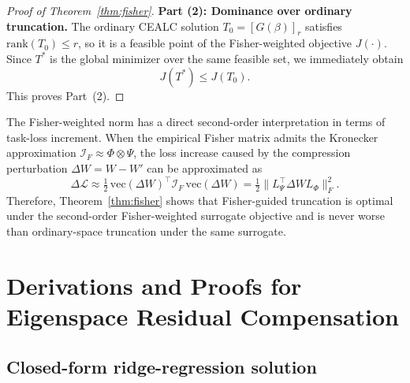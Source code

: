 \documentclass[a4paper,fleqn]{cas-dc}
\begin{document}
\begin{proof}[Proof of Theorem~\ref{thm:fisher}]
\medskip
\noindent\textbf{Part (2): Dominance over ordinary truncation.}
The ordinary CEALC solution $T_0=[G(\beta)]_r$ satisfies $\mathrm{rank}(T_0)\le r$, so it is a feasible point of the Fisher-weighted objective $J(\cdot)$. Since $T^*$ is the global minimizer over the same feasible set, we immediately obtain
\begin{equation}
J(T^*) \le J(T_0).
\end{equation}
This proves Part~(2).
\end{proof}

\begin{rmk}
The Fisher-weighted norm has a direct second-order interpretation in terms of task-loss increment. When the empirical Fisher matrix admits the Kronecker approximation $\mathcal{I}_F \approx \Phi \otimes \Psi$, the loss increase caused by the compression perturbation $\Delta W = W-W'$ can be approximated as
\begin{equation}
\Delta \mathcal{L} \approx \tfrac{1}{2}\,\mathrm{vec}(\Delta W)^{\top} \mathcal{I}_F \, \mathrm{vec}(\Delta W)
= \tfrac{1}{2}\|L_\Psi^{\top}\Delta W L_\Phi\|_F^2.
\end{equation}
Therefore, Theorem~\ref{thm:fisher} shows that Fisher-guided truncation is optimal under the second-order Fisher-weighted surrogate objective and is never worse than ordinary-space truncation under the same surrogate.
\end{rmk}

\section{Derivations and Proofs for Eigenspace Residual Compensation}\label{app:lemma-corollary}

\subsection{Closed-form ridge-regression solution}\label{app:ridge-derivation}
\end{document}
